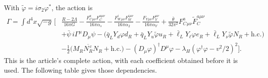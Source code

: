\documentclass[aps,prx,onecolumn,10pt,notitlepage,nofootinbib,longbibliography]{revtex4-2}
\numberwithin{equation}{section}
\numberwithin{table}{section}
\begin{document}
With $\widetilde\varphi=i\sigma_2\varphi^*$, the action is
\begin{equation}
\begin{split}
\Gamma=\int d^4x\sqrt{-g}\,\bigg[&
 \frac{R-2\Lambda}{16\pi G}
 -\frac{F_C^a{}_{\mu\nu}F_C^{a\mu\nu}}{16\pi\alpha_s}
 -\frac{F_W^i{}_{\mu\nu}F_W^{i\mu\nu}}{16\pi\alpha_2}
 -\frac{F_Y{}_{\mu\nu}F_Y^{\mu\nu}}{16\pi\alpha_Y}
 +\frac{\bar\theta}{32\pi^2}F_C^a{}_{\mu\nu}\widetilde F_C^{a\mu\nu}\\
 &+\bar\psi\,i\Gamma^\mu D_\mu\psi
 -\bigl(\bar q_LY_d\varphi d_R+\bar q_LY_u\widetilde\varphi u_R
       +\bar\ell_LY_\ell\varphi e_R+\bar\ell_LY_\nu\widetilde\varphi N_R
       +\mathrm{h.c.}\bigr)\\
 &-\frac12\bigl(M_R\overline{N_R^{\,c}}N_R+\mathrm{h.c.}\bigr)
 -(D_\mu\varphi)^\dagger D^\mu\varphi
 -\lambda_H(\varphi^\dagger\varphi-v^2/2)^2\bigg].
\end{split}
\label{eq:completeaction}
\end{equation}
This is the article's complete action, with each coefficient obtained
before it is used. The following table gives those dependencies.
\end{document}
